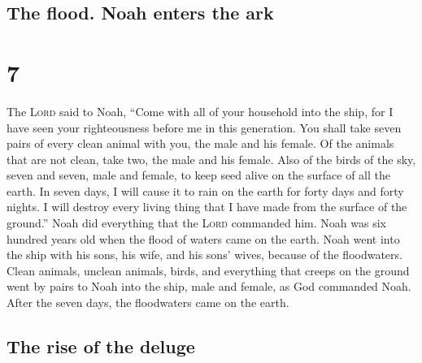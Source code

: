 \hypertarget{the-flood.-noah-enters-the-ark}{%
\subsection{The flood. Noah enters the
ark}\label{the-flood.-noah-enters-the-ark}}

\hypertarget{section-6}{%
\section{7}\label{section-6}}

 The \textsc{Lord} said to Noah, ``Come with all of your
household into the ship, for I have seen your righteousness before me in
this generation.  You shall take seven pairs of every
clean animal with you, the male and his female. Of the animals that are
not clean, take two, the male and his female.  Also of the
birds of the sky, seven and seven, male and female, to keep seed alive
on the surface of all the earth.  In seven days, I will
cause it to rain on the earth for forty days and forty nights. I will
destroy every living thing that I have made from the surface of the
ground.''  Noah did everything that the \textsc{Lord}
commanded him.  Noah was six hundred years old when the
flood of waters came on the earth.  Noah went into the
ship with his sons, his wife, and his sons' wives, because of the
floodwaters.  Clean animals, unclean animals, birds, and
everything that creeps on the ground  went by pairs to
Noah into the ship, male and female, as God commanded Noah.
 After the seven days, the floodwaters came on the earth.

\hypertarget{the-rise-of-the-deluge}{%
\subsection{The rise of the deluge}\label{the-rise-of-the-deluge}}

